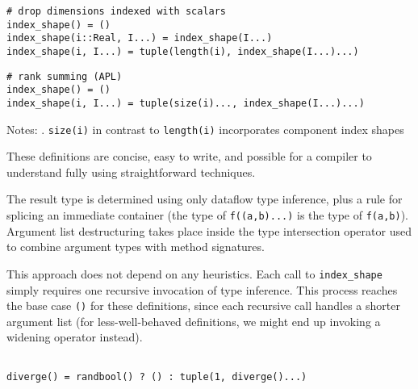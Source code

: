 \documentclass[preprint]{sigplanconf}
\begin{document}

{\small
\begin{verbatim}
# drop dimensions indexed with scalars
index_shape() = ()
index_shape(i::Real, I...) = index_shape(I...)
index_shape(i, I...) = tuple(length(i), index_shape(I...)...)
\end{verbatim}
}


{\small
\begin{verbatim}
# rank summing (APL)
index_shape() = ()
index_shape(i, I...) = tuple(size(i)..., index_shape(I...)...)
\end{verbatim}
}


\noindent Notes: . \verb+size(i)+ in contrast to \verb+length(i)+ incorporates component index shapes \newline

These definitions are concise, easy to write, and possible for a compiler to
understand fully using straightforward techniques.


The result type is determined using only dataflow type inference, plus a rule
for splicing an immediate container (the type of \texttt{f((a,b)...)} is the
type of \texttt{f(a,b)}). Argument list destructuring takes place inside the
type intersection operator used to combine argument types with method
signatures.

This approach does not depend on any heuristics. Each call to
\texttt{index\_shape} simply requires one recursive invocation of type
inference. This process reaches the base case \texttt{()} for these
definitions, since each recursive call handles a shorter argument list (for
less-well-behaved definitions, we might end up invoking a widening operator
instead).

\begin{verbatim}

diverge() = randbool() ? () : tuple(1, diverge()...)

\end{verbatim}
\end{document}
